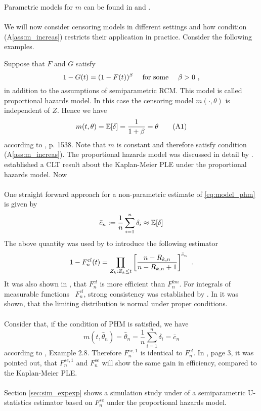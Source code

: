 %
Parametric models for $m$ can be found in \cite{cox1970binary} and \cite{collett2014modelling}.\\
\\
We will now consider censoring models in different settings and how condition (A\ref{ass:m_increas}) restricts their application in practice. Consider the following examples.
%
\begin{example}\label{ex:intro_phm}
	Suppose that $F$ and $G$ satisfy 
	$$1-G(t) = (1-F(t))^\beta \quad \textrm{ for some }\quad \beta > 0\textrm{ ,}$$
	in addition to the assumptions of semiparametric RCM. This model is called proportional hazards model. In this case the censoring model $m(\cdot, \theta)$ is independent of $Z$. Hence we have
	\begin{equation*}
		m(t,\theta)  = \E[\delta] = \frac{1}{1+\beta} = \theta \numberthis\label{eq:model_phm}
	\end{equation*}
	according to \cite{dikta1995asymptotic}, p. 1538. Note that $m$ is constant and therefore satisfy condition (A\ref{ass:m_increas}).
	The proportional hazards model was discussed in detail by \cite{koziol1976cramer}. \cite{breslow1974largesample} established a CLT result about the Kaplan-Meier PLE under the proportional hazards model. Now \\
	\\
	One straight forward approach for a non-parametric estimate of \eqref{eq:model_phm} is given by
	$$\bar c_n := \frac{1}{n} \sum_{i=1}^{n} \delta_i \approx \mathbb{E}[\delta]$$
	The above quantity was used by \cite{cheng1987mle} to introduce the following estimator
	$$1-F^{cl}_n(t) =  \prod_{Z_k: Z_k\leq t}\left[\frac{n-R_{k,n}}{n-R_{k,n}+1}\right]^{\bar c_n} \textrm{ .}$$
	It was also shown in \cite{cheng1987mle}, that $F_n^{cl}$ is more efficient than $F_n^{km}$. For integrals of measurable functions \wrt\ $F^{cl}_n$, strong consistency was established by \cite{stute1992strong}. In \cite{dikta1995asymptotic} it was shown, that the limiting distribution is normal under proper conditions. \\
	\\
	Consider that, if the condition of PHM is satisfied, we have
	$$m(t,\hat \theta_n) = \hat \theta_n = \frac{1}{n} \sum_{i=1}^{n} \delta_i = \bar c_n$$
	according to \cite{dikta1998semiparametric}, Example 2.8. Therefore $F^{se,1}_n$ is identical to $F^{cl}_n$. In \cite{dikta2000strong}, page 3, it was pointed out, that $F^{se,1}_n$ and $F^{se}_n$ will show the same gain in efficiency, compared to the Kaplan-Meier PLE.\\
	\\
	Section \ref{sec:sim_expexp} shows a simulation study under of a semiparametric U-statistics estimator based on $F^{se}_n$ under the proportional hazards model.
\end{example}
